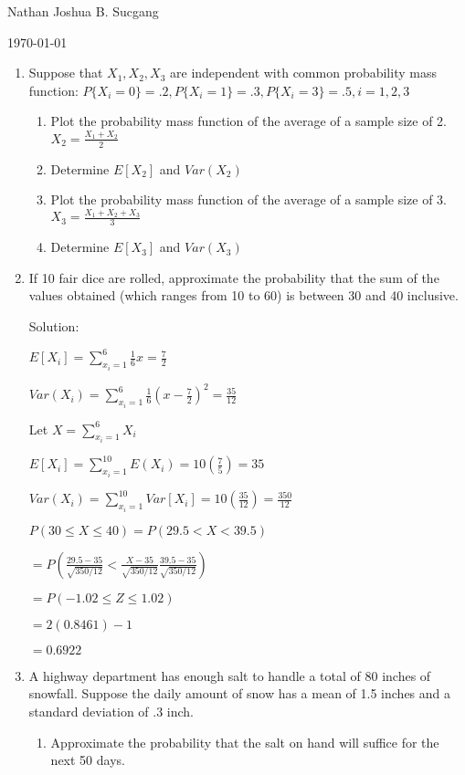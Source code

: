 \documentclass{article}
\begin{document}
Nathan Joshua B. Sucgang

\today

\begin{enumerate}
    \item Suppose that $X_1, X_2, X_3$ are independent with common probability mass function: $P\{X_i = 0 \} = .2, P\{X_i = 1 \} = .3, P\{X_i = 3 \} = .5, i = 1,2,3$
    \begin{enumerate}
        \item Plot the probability mass function of the average of a sample size of 2. $X_2 = \frac{X_1+X_2}{2}$
        \item Determine $E[X_2]$ and $Var(X_2)$
        \item Plot the probability mass function of the average of a sample size of 3. $X_3 = \frac{X_1+X_2+X_3}{3}$
        \item Determine $E[X_3]$ and $Var(X_3)$
    \end{enumerate}  
    \item If 10 fair dice are rolled, approximate the probability that the sum of the values obtained (which ranges from 10 to 60) is between 30 and 40 inclusive.
    
    Solution:

    $E[X_i] = \displaystyle \sum_{x_i = 1}^6 {\frac{1}{6}x = \frac{7}{2}}$

    $Var(X_i) = \displaystyle \sum_{x_i = 1}^6 {\frac{1}{6}{(x - \frac{7}{2})}^2 = \frac{35}{12}}$

    Let $X = \displaystyle \sum_{x_i = 1}^6 {X_i}$

    $E[X_i] = \displaystyle \sum_{x_i = 1}^{10} {E(X_i)} = 10(\frac{7}{5}) = 35$

    $Var(X_i) = \displaystyle \sum_{x_i = 1}^{10} {Var[X_i]} = 10(\frac{35}{12}) = \frac{350}{12}$

    $P(30 \leq X \leq 40) = P(29.5 < X < 39.5)$

    $= \displaystyle P\left(\frac{29.5 - 35}{\sqrt{350/12}}<\frac{X - 35}{\sqrt{350/12}}\frac{39.5 - 35}{\sqrt{350/12}}\right)$

    $= \displaystyle P\left(-1.02 \leq Z \leq 1.02 \right)$

    $= 2(0.8461)-1$

    $=0.6922$

    \item A highway department has enough salt to handle a total of 80 inches of snowfall. Suppose the daily amount of snow has a mean of 1.5 inches and a standard deviation of .3 inch.
    \begin{enumerate}
        \item Approximate the probability that the salt on hand will suffice for the next 50 days.
        

\end{enumerate}
\end{enumerate}
\end{document}
